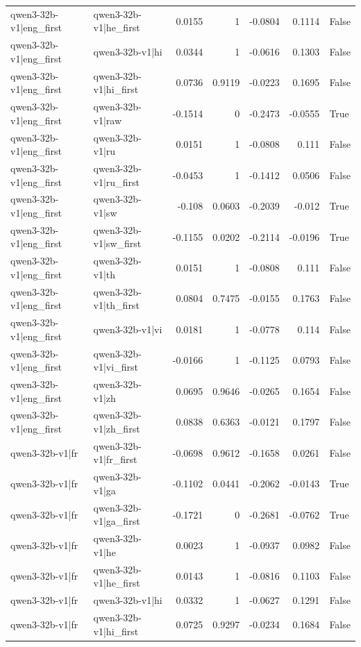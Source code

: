 \begin{table}
\begin{tabular}{l l r r r r l}
qwen3-32b-v1|eng_first & qwen3-32b-v1|he_first & 0.0155 & 1 & -0.0804 & 0.1114 & False \\
qwen3-32b-v1|eng_first & qwen3-32b-v1|hi & 0.0344 & 1 & -0.0616 & 0.1303 & False \\
qwen3-32b-v1|eng_first & qwen3-32b-v1|hi_first & 0.0736 & 0.9119 & -0.0223 & 0.1695 & False \\
qwen3-32b-v1|eng_first & qwen3-32b-v1|raw & -0.1514 & 0 & -0.2473 & -0.0555 & True \\
qwen3-32b-v1|eng_first & qwen3-32b-v1|ru & 0.0151 & 1 & -0.0808 & 0.111 & False \\
qwen3-32b-v1|eng_first & qwen3-32b-v1|ru_first & -0.0453 & 1 & -0.1412 & 0.0506 & False \\
qwen3-32b-v1|eng_first & qwen3-32b-v1|sw & -0.108 & 0.0603 & -0.2039 & -0.012 & True \\
qwen3-32b-v1|eng_first & qwen3-32b-v1|sw_first & -0.1155 & 0.0202 & -0.2114 & -0.0196 & True \\
qwen3-32b-v1|eng_first & qwen3-32b-v1|th & 0.0151 & 1 & -0.0808 & 0.111 & False \\
qwen3-32b-v1|eng_first & qwen3-32b-v1|th_first & 0.0804 & 0.7475 & -0.0155 & 0.1763 & False \\
qwen3-32b-v1|eng_first & qwen3-32b-v1|vi & 0.0181 & 1 & -0.0778 & 0.114 & False \\
qwen3-32b-v1|eng_first & qwen3-32b-v1|vi_first & -0.0166 & 1 & -0.1125 & 0.0793 & False \\
qwen3-32b-v1|eng_first & qwen3-32b-v1|zh & 0.0695 & 0.9646 & -0.0265 & 0.1654 & False \\
qwen3-32b-v1|eng_first & qwen3-32b-v1|zh_first & 0.0838 & 0.6363 & -0.0121 & 0.1797 & False \\
qwen3-32b-v1|fr & qwen3-32b-v1|fr_first & -0.0698 & 0.9612 & -0.1658 & 0.0261 & False \\
qwen3-32b-v1|fr & qwen3-32b-v1|ga & -0.1102 & 0.0441 & -0.2062 & -0.0143 & True \\
qwen3-32b-v1|fr & qwen3-32b-v1|ga_first & -0.1721 & 0 & -0.2681 & -0.0762 & True \\
qwen3-32b-v1|fr & qwen3-32b-v1|he & 0.0023 & 1 & -0.0937 & 0.0982 & False \\
qwen3-32b-v1|fr & qwen3-32b-v1|he_first & 0.0143 & 1 & -0.0816 & 0.1103 & False \\
qwen3-32b-v1|fr & qwen3-32b-v1|hi & 0.0332 & 1 & -0.0627 & 0.1291 & False \\
qwen3-32b-v1|fr & qwen3-32b-v1|hi_first & 0.0725 & 0.9297 & -0.0234 & 0.1684 & False \\

\end{tabular}
\end{table}
